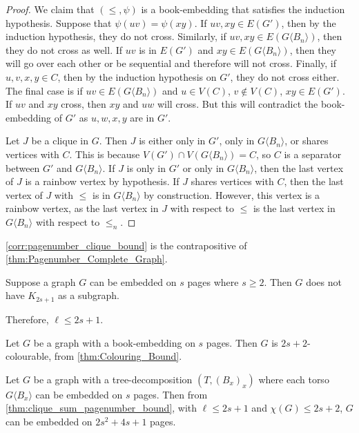 \begin{proof}
	We claim that \((\leq , \psi)\) is a book-embedding that satisfies the induction hypothesis. Suppose that \(\psi(uv) = \psi(xy)\). If \(uv, xy \in E(G')\), then by the induction hypothesis, they do not cross. Similarly, if \(uv, xy \in E(G \langle B_n \rangle)\), then they do not cross as well. If \(uv\) is in \(E(G')\) and \(xy \in E(G \langle B_n \rangle)\), then they will go over each other or be sequential and therefore will not cross.
	Finally, if \(u, v, x, y \in C\), then by the induction hypothesis on \(G'\), they do not cross either. The final case is if \(uv \in E(G\langle B_{n} \rangle)\) and \(u \in V(C)\), \(v \notin V(C)\), \(xy \in E(G')\). If \(uv\) and \(xy\) cross, then \(xy\) and \(uw\) will cross. But this will contradict the book-embedding of \(G'\) as $u, w, x, y$ are in $G'$.

	Let \(J\) be a clique in \(G\). Then $J$ is either only in $G'$, only in $G\langle B_n \rangle$, or shares vertices with $C$. This is because $V(G') \cap V(G\langle B_n \rangle) = C$, so $C$ is a separator between $G'$ and $G \langle B_n \rangle$. If $J$ is only in $G'$ or only in $G\langle B_n \rangle$, then the last vertex of $J$ is a rainbow vertex by hypothesis. If $J$ shares vertices with $C$, then the last vertex of $J$ with $\leq$ is in $G\langle B_n \rangle$ by construction. However, this vertex is a rainbow vertex, as the last vertex in $J$ with respect to $\leq$ is the last vertex in $G\langle B_n \rangle$ with respect to $\leq_n$. 
\end{proof}

\cref{corr:pagenumber_clique_bound} is the contrapositive of \cref{thm:Pagenumber_Complete_Graph}.

\begin{corollary}\label{corr:pagenumber_clique_bound}
	Suppose a graph $G$ can be embedded on $s$ pages where $s \geq 2$. Then \(G\) does not have $K_{2s + 1}$ as a subgraph.
\end{corollary}
Therefore, \(\ell \leq 2s + 1\).

Let $G$ be a graph with a book-embedding on $s$ pages. Then $G$ is $2s + 2$-colourable, from \cref{thm:Colouring_Bound}.
\begin{corollary}\label{corr:bded_pn_tree_decomp}
	Let \(G\) be a graph with a tree-decomposition \((T, (B_x)_x)\) where each torso \(G \langle B_x \rangle\) can be embedded on $s$ pages. Then from \cref{thm:clique_sum_pagenumber_bound}, with $\ell \leq 2s + 1$ and $\chi(G) \leq 2 s + 2$, \(G\) can be embedded on \(2s^2 + 4s + 1\) pages.
\end{corollary}

